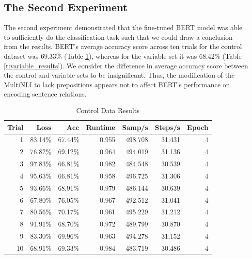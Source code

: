 \documentclass[12pt,letterpaper]{article}
\begin{document}
\subsection{The Second Experiment}
The second experiment demonstrated that the fine-tuned BERT model was able to sufficiently do the classification task such that we could draw a conclusion from the results. BERT's average accuracy score across ten trials for the control dataset was 69.33\% (Table \ref{t:control_results}), whereas for the variable set it was 68.42\% (Table \ref{t:variable_results}). We consider the difference in average accuracy score between the control and variable sets to be insignificant. Thus, the modification of the MultiNLI to lack prepositions appears not to affect BERT's performance on encoding sentence relations. 



\begin{table}[!htbp]
    \centering
    \begin{tabular}{|r|r|r|r|r|r|r|}
    \hline
        Trial & Loss & Acc & Runtime & Samp/s & Steps/s & Epoch \\ \hline
        1 & 83.14\% & 67.44\% & 0.955 & 498.708 & 31.431 & 4 \\ \hline
        2 & 76.82\% & 69.12\% & 0.964 & 494.019 & 31.136 & 4 \\ \hline
        3 & 97.83\% & 66.81\% & 0.982 & 484.548 & 30.539 & 4 \\ \hline
        4 & 95.63\% & 66.81\% & 0.958 & 496.725 & 31.306 & 4 \\ \hline
        5 & 93.66\% & 68.91\% & 0.979 & 486.144 & 30.639 & 4 \\ \hline
        6 & 67.80\% & 76.05\% & 0.967 & 492.512 & 31.041 & 4 \\ \hline
        7 & 80.56\% & 70.17\% & 0.961 & 495.229 & 31.212 & 4 \\ \hline
        8 & 91.91\% & 68.70\% & 0.972 & 489.799 & 30.870 & 4 \\ \hline
        9 & 83.30\% & 69.96\% & 0.963 & 494.278 & 31.152 & 4 \\ \hline
        10 & 68.91\% & 69.33\% & 0.984 & 483.719 & 30.486 & 4 \\ \hline
    \end{tabular}
    \caption{Control Data Results}
    \label{t:control_results}
\end{table}

\vspace{0.5cm}
\end{document}
